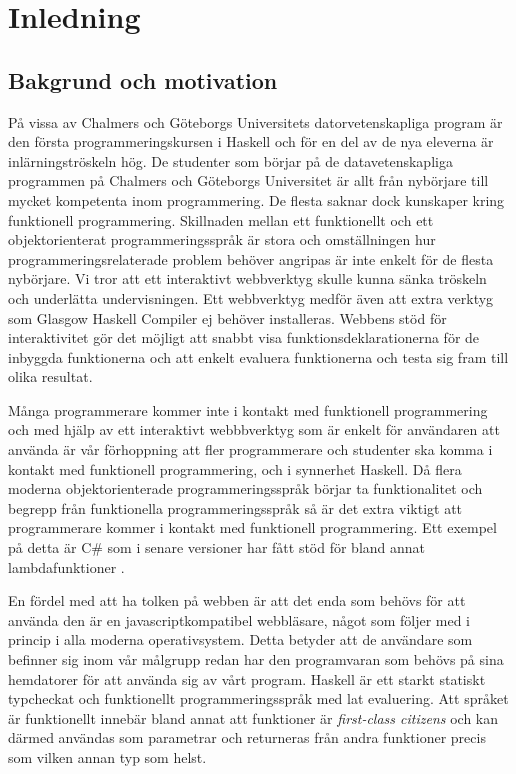 \section{Inledning}
\subsection{Bakgrund och motivation}
På vissa av Chalmers och Göteborgs Universitets datorvetenskapliga program är den första programmeringskursen i Haskell \citep{haskell98} och för en del av de nya eleverna är inlärningströskeln hög. De studenter som börjar på de datavetenskapliga programmen på Chalmers och Göteborgs Universitet är allt från nybörjare till mycket kompetenta inom programmering. De flesta saknar dock kunskaper kring funktionell programmering. Skillnaden mellan ett funktionellt och ett objektorienterat programmeringsspråk är stora och omställningen hur programmeringsrelaterade problem behöver angripas  är inte enkelt för de flesta nybörjare. Vi tror att ett interaktivt webbverktyg skulle kunna sänka tröskeln och underlätta undervisningen. Ett webbverktyg medför även att extra verktyg som Glasgow Haskell Compiler \citep{ghc} ej behöver installeras. Webbens stöd för interaktivitet gör det möjligt att snabbt visa funktionsdeklarationerna för de inbyggda funktionerna och att enkelt evaluera funktionerna och testa sig fram till olika resultat.

Många programmerare kommer inte i kontakt med funktionell programmering  och med hjälp av ett interaktivt webbbverktyg som är enkelt för användaren att använda är vår förhoppning att fler programmerare och studenter ska komma i kontakt med funktionell programmering, och i synnerhet Haskell. Då flera moderna objektorienterade programmeringsspråk börjar ta funktionalitet och begrepp från funktionella programmeringsspråk så är det extra viktigt att programmerare kommer i kontakt med funktionell programmering. Ett exempel på detta är C\# som i senare versioner har fått stöd för bland annat lambdafunktioner \citep{csharp}. 

En fördel med att ha tolken på webben är att det enda som behövs för att använda den är en javascriptkompatibel webbläsare, något som följer med i princip i alla moderna operativsystem. Detta betyder att de användare som befinner sig inom vår målgrupp redan har den programvaran som behövs på sina hemdatorer för att använda sig av vårt program.  
Haskell är ett starkt statiskt typcheckat och funktionellt programmeringsspråk med lat evaluering. %
Att språket är funktionellt innebär bland annat att funktioner är \emph{first-class citizens} och kan därmed användas som parametrar och returneras från andra funktioner precis som vilken annan typ som helst.

